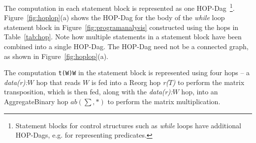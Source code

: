
%


The computation in each statement block is represented as one HOP-Dag~\footnote{Statement blocks for control structures such as {\it while} loops have additional HOP-Dags, e.g. for representing predicates.}. Figure~\ref{fig:hoplop}(a) shows the HOP-Dag for the body of the \textit{while} loop statement block in Figure~\ref{fig:programanalysis} constructed using the hops in Table~\ref{tab:hop}. Note how multiple statements in a statement block have been combined into a single HOP-Dag. The HOP-Dag need not be a connected graph, as shown in Figure~\ref{fig:hoplop}(a).

The computation \texttt{t(W)\mmult W} in the statement block is represented 
using four hops -- a {\it data(r):$W$} hop that reads $W$ is fed into a Reorg hop 
{\it r($T$)} to perform the matrix transposition, which is then fed, along with the {\it 
data(r):$W$} hop, into an AggregateBinary hop {\it $ab(\sum,*)$} to perform the matrix 
multiplication. 


